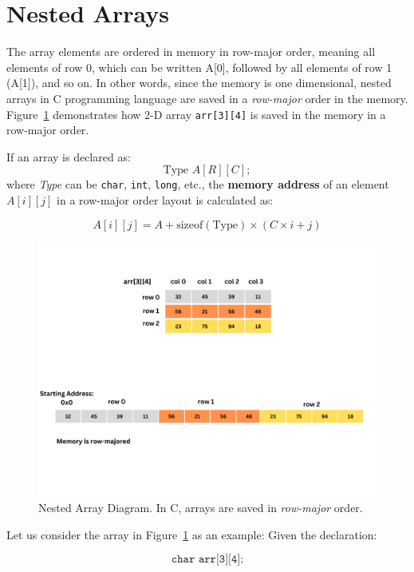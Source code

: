 \section{Nested Arrays}
 The array elements are ordered in memory in row-major order, meaning all elements of row 0, which can be written A[0], followed by all elements of row 1 (A[1]), and so on. In other words, since the memory is one dimensional, nested arrays in C programming language are saved in a \textit{row-major} order in the memory. Figure~\ref{fig:nested-array} demonstrates how 2-D array \texttt{arr[3][4]} is saved in the memory in a row-major order.

 
 If an array is declared as:
\[
\text{Type } A[R][C];
\]
where \textit{Type} can be \texttt{char}, \texttt{int}, \texttt{long}, etc., the \textbf{memory address} of an element \( A[i][j] \) in a row-major order layout is calculated as:

\begin{equation}
A[i][j] = A + \text{sizeof}(\text{Type}) \times (C \times i + j)
\end{equation}

\begin{figure}[t]
    \centering
    \includegraphics[width=\textwidth]{images/nested_arrays.pdf}
    \caption{Nested Array Diagram. In C, arrays are saved in \textit{row-major} order.}
    \label{fig:nested-array}
\end{figure}

\noindent Let us consider the array in Figure~\ref{fig:nested-array} as an example:  
Given the declaration:


\[
\texttt{char arr[3][4];}
\]

